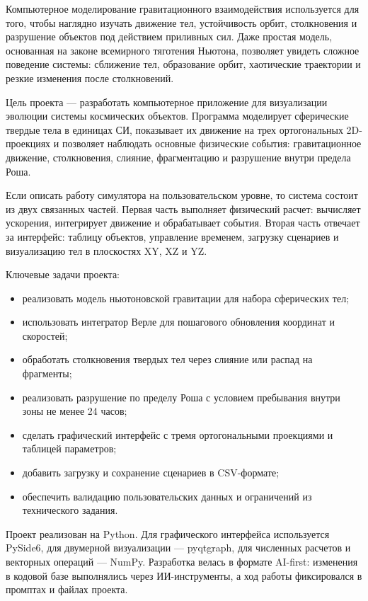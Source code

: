 \documentclass[14pt,a4paper]{extarticle}
\begin{document}
	Компьютерное моделирование гравитационного взаимодействия используется для того, чтобы наглядно изучать движение тел, устойчивость орбит, столкновения и разрушение объектов под действием приливных сил. Даже простая модель, основанная на законе всемирного тяготения Ньютона, позволяет увидеть сложное поведение системы: сближение тел, образование орбит, хаотические траектории и резкие изменения после столкновений.
	
	Цель проекта --- разработать компьютерное приложение для визуализации эволюции системы космических объектов. Программа моделирует сферические твердые тела в единицах СИ, показывает их движение на трех ортогональных 2D-проекциях и позволяет наблюдать основные физические события: гравитационное движение, столкновения, слияние, фрагментацию и разрушение внутри предела Роша.
	
	Если описать работу симулятора на пользовательском уровне, то система состоит из двух связанных частей. Первая часть выполняет физический расчет: вычисляет ускорения, интегрирует движение и обрабатывает события. Вторая часть отвечает за интерфейс: таблицу объектов, управление временем, загрузку сценариев и визуализацию тел в плоскостях XY, XZ и YZ.
	
	Ключевые задачи проекта:
	\begin{itemize}
		\item реализовать модель ньютоновской гравитации для набора сферических тел;
		\item использовать интегратор Верле для пошагового обновления координат и скоростей;
		\item обработать столкновения твердых тел через слияние или распад на фрагменты;
		\item реализовать разрушение по пределу Роша с условием пребывания внутри зоны не менее 24 часов;
		\item сделать графический интерфейс с тремя ортогональными проекциями и таблицей параметров;
		\item добавить загрузку и сохранение сценариев в CSV-формате;
		\item обеспечить валидацию пользовательских данных и ограничений из технического задания.
	\end{itemize}
	
	Проект реализован на Python. Для графического интерфейса используется PySide6, для двумерной визуализации --- pyqtgraph, для численных расчетов и векторных операций --- NumPy. Разработка велась в формате AI-first: изменения в кодовой базе выполнялись через ИИ-инструменты, а ход работы фиксировался в промптах и файлах проекта.
		
\end{document}
